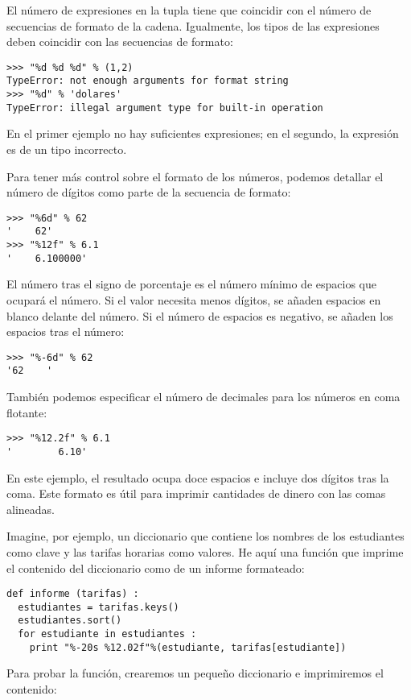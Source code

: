 El número de expresiones en la tupla tiene que coincidir con el número
de secuencias de formato de la cadena. Igualmente, los tipos de las
expresiones deben coincidir con las secuencias de formato:


\beforeverb
\begin{verbatim}
>>> "%d %d %d" % (1,2)
TypeError: not enough arguments for format string
>>> "%d" % 'dolares'
TypeError: illegal argument type for built-in operation
\end{verbatim}
\afterverb
%
En el primer ejemplo no hay suficientes expresiones; en el
segundo, la expresión es de un tipo incorrecto.

Para tener más control sobre el formato de los números, podemos detallar
el número de dígitos como parte de la secuencia de formato:

\beforeverb
\begin{verbatim}
>>> "%6d" % 62
'    62'
>>> "%12f" % 6.1
'    6.100000'
\end{verbatim}
\afterverb
%
El número tras el signo de porcentaje es el número mínimo de espacios
que ocupará el número. Si el valor necesita menos dígitos, se añaden
espacios en blanco delante del número. Si el número de espacios es
negativo, se añaden los espacios tras el número:

\beforeverb
\begin{verbatim}
>>> "%-6d" % 62
'62    '
\end{verbatim}
\afterverb
%
También podemos especificar el número de decimales para los
números en coma flotante:

\beforeverb
\begin{verbatim}
>>> "%12.2f" % 6.1
'        6.10'
\end{verbatim}
\afterverb
%
En este ejemplo, el resultado ocupa doce espacios e incluye dos dígitos
tras la coma. Este formato es útil para imprimir cantidades de dinero con
las comas alineadas.


Imagine, por ejemplo, un diccionario que contiene los nombres
de los estudiantes como clave y las tarifas horarias como valores.
He aquí una función que imprime el contenido del diccionario como
de un informe formateado:

\beforeverb
\begin{verbatim}
def informe (tarifas) :
  estudiantes = tarifas.keys()
  estudiantes.sort()
  for estudiante in estudiantes :
    print "%-20s %12.02f"%(estudiante, tarifas[estudiante])
\end{verbatim}
\afterverb
%
Para probar la función, crearemos un pequeño diccionario e
imprimiremos el contenido:

